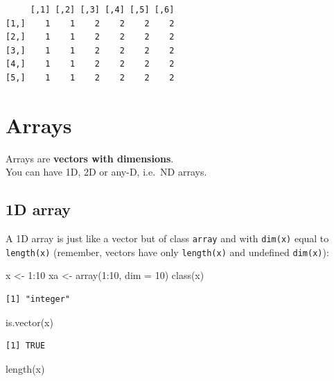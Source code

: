 \documentclass[
]{book}
\newenvironment{Shaded}{\begin{snugshade}}{\end{snugshade}}
\newcommand{\AttributeTok}[1]{\textcolor[rgb]{0.77,0.63,0.00}{#1}}
\newcommand{\DecValTok}[1]{\textcolor[rgb]{0.00,0.00,0.81}{#1}}
\newcommand{\FunctionTok}[1]{\textcolor[rgb]{0.00,0.00,0.00}{#1}}
\newcommand{\NormalTok}[1]{#1}
\newcommand{\OtherTok}[1]{\textcolor[rgb]{0.56,0.35,0.01}{#1}}
\newcommand{\SpecialCharTok}[1]{\textcolor[rgb]{0.00,0.00,0.00}{#1}}
\begin{document}
\begin{verbatim}
     [,1] [,2] [,3] [,4] [,5] [,6]
[1,]    1    1    2    2    2    2
[2,]    1    1    2    2    2    2
[3,]    1    1    2    2    2    2
[4,]    1    1    2    2    2    2
[5,]    1    1    2    2    2    2
\end{verbatim}

\hypertarget{arrays}{%
\section{Arrays}\label{arrays}}

Arrays are \textbf{vectors with dimensions}.\\
You can have 1D, 2D or any-D, i.e.~ND arrays.

\hypertarget{d-array}{%
\subsection{1D array}\label{d-array}}

A 1D array is just like a vector but of class \texttt{array} and with \texttt{dim(x)} equal to \texttt{length(x)} (remember, vectors have only \texttt{length(x)} and undefined \texttt{dim(x)}):

\begin{Shaded}
\begin{Highlighting}[]
\NormalTok{x }\OtherTok{\textless{}{-}} \DecValTok{1}\SpecialCharTok{:}\DecValTok{10}
\NormalTok{xa }\OtherTok{\textless{}{-}} \FunctionTok{array}\NormalTok{(}\DecValTok{1}\SpecialCharTok{:}\DecValTok{10}\NormalTok{, }\AttributeTok{dim =} \DecValTok{10}\NormalTok{)}
\FunctionTok{class}\NormalTok{(x)}
\end{Highlighting}
\end{Shaded}

\begin{verbatim}
[1] "integer"
\end{verbatim}

\begin{Shaded}
\begin{Highlighting}[]
\FunctionTok{is.vector}\NormalTok{(x)}
\end{Highlighting}
\end{Shaded}

\begin{verbatim}
[1] TRUE
\end{verbatim}

\begin{Shaded}
\begin{Highlighting}[]
\FunctionTok{length}\NormalTok{(x)}
\end{Highlighting}
\end{Shaded}
\end{document}
